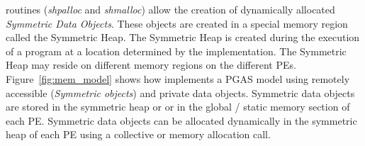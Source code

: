 \openshmem routines (\textit{shpalloc} and \textit{shmalloc}) allow the creation of dynamically allocated \emph{Symmetric
Data Objects}. These objects are created in a special memory region
called the Symmetric Heap. The Symmetric Heap is created during the execution of a program at a location
determined by the implementation. The Symmetric Heap may reside on
different memory regions on the different \ac{PE}s. Figure~\ref{fig:mem_model} shows how \openshmem implements a \ac{PGAS} model 
using remotely accessible (\emph{Symmetric objects}) and private data objects. Symmetric data objects are stored in the symmetric heap or 
or in the global / static memory section of each \ac{PE}. Symmetric data objects can be allocated dynamically in the symmetric heap of each \ac{PE} using
a collective  or  memory allocation call.
     
